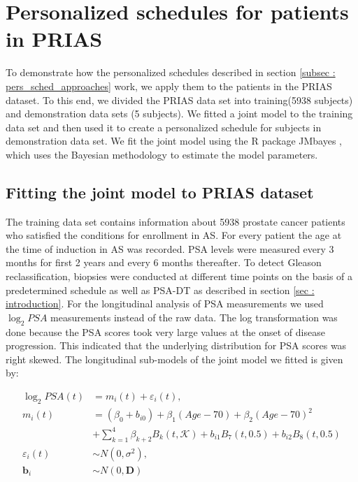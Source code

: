 
\section{Personalized schedules for patients in PRIAS}
\label{sec : pers_schedule_PRIAS}

To demonstrate how the personalized schedules described in section \ref{subsec : pers_sched_approaches} work, we apply them to the patients in the PRIAS dataset. To this end, we divided the PRIAS data set into training(5938 subjects) and demonstration data sets (5 subjects). We fitted a joint model to the training data set and then used it to create a personalized schedule for subjects in demonstration data set. We fit the joint model using the R package JMbayes \citep{rizopoulosJMbayes}, which uses the Bayesian methodology to estimate the model parameters. 

\subsection{Fitting the joint model to PRIAS dataset}
The training data set contains information about 5938 prostate cancer patients who satisfied the conditions for enrollment in AS. For every patient the age at the time of induction in AS was recorded. PSA levels were measured every 3 months for first 2 years and every 6 months thereafter. To detect Gleason reclassification, biopsies were conducted at different time points on the basis of a predetermined schedule as well as PSA-DT as described in section \ref{sec : introduction}. For the longitudinal analysis of PSA measurements we used $\log_2 PSA$ measurements instead of the raw data. The log transformation was done because the PSA scores took very large values at the onset of disease progression. This indicated that the underlying distribution for PSA scores was right skewed. The longitudinal sub-models of the joint model we fitted is given by:

\begin{align*}
\log_2 PSA(t) &= m_i(t) + \varepsilon_i(t), \\
m_i(t) &= (\beta_0 + b_{i0}) + \beta_1 (Age-70) + \beta_2 (Age-70)^2\\ 
&+ \sum_{k=1}^4 \beta_{k+2} B_k(t,\mathcal{K}) + b_{i1} B_7(t, 0.5) + b_{i2} B_8(t, 0.5) \\
\varepsilon_i(t) & \sim N(0, \sigma^2),\\
\boldsymbol{b}_i & \sim N(0, \boldsymbol{D})
\end{align*}

